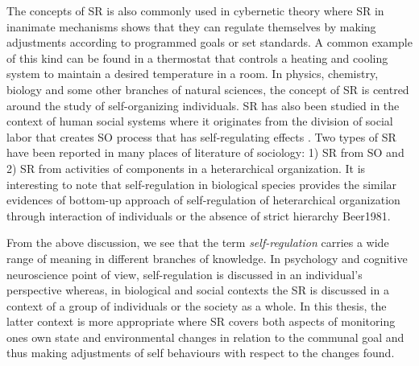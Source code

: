 The concepts of SR is also commonly used in cybernetic theory where SR in inanimate mechanisms shows that they can regulate themselves by making adjustments according to programmed goals or set standards. A common example of this kind can be found in a thermostat that controls a heating and cooling system to maintain a desired temperature in a room. In physics, chemistry, biology and some other branches of natural sciences, the concept of SR is centred around the study of self-organizing individuals. SR has also been studied in the context of human social systems where it originates from the division of social labor that creates SO process that has self-regulating effects \cite{Kppers+1990}. Two types of SR have been reported in many places of literature of sociology: 1) SR from SO and 2) SR from activities of components in a heterarchical organization. It is interesting to note that self-regulation in biological species provides the similar evidences of bottom-up approach of self-regulation of heterarchical organization through interaction of individuals or the absence of strict hierarchy {Beer1981}. 

From the above discussion, we see that the term {\em self-regulation} carries a wide range of meaning in different branches of knowledge. In psychology and cognitive neuroscience point of view, self-regulation is discussed in an individual's perspective whereas, in biological and social contexts the SR is discussed in a context of a group of individuals or the society as a whole. In  this thesis, the latter context is more appropriate where  SR covers both aspects of monitoring ones own state and environmental changes in relation to the communal goal and thus making adjustments of self behaviours with respect to the changes found. 
